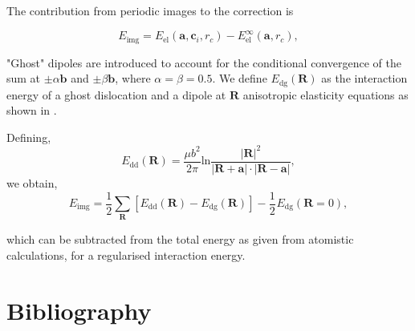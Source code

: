 \documentclass[a4paper,11pt]{article}
\begin{document}
The contribution from periodic images to the correction is 

\[ E_{\text{img} } = E_{\text{el}} (\mathbf{a}, \mathbf{c}_i , r_c) - E_{\text{el}}^{\infty}
   (\mathbf{a}, r_c),\]

"Ghost" dipoles are introduced to account for the conditional convergence of the sum at \(\pm\alpha
   \mathbf{b}\) and \(\pm \beta\mathbf{b}\), where \(\alpha = \beta = 0.5\). We define \(E_{\text{dg}} (\mathbf{R})\) as the
interaction energy of a ghost dislocation and a dipole at \(\mathbf{R}\) anisotropic elasticity
equations as shown in \cite{Cai2003}.


Defining, 
 \[ E_{\text{dd}} (\mathbf{R}) = \frac{\mu b^2}{2\pi}
   \text{ln}\frac{|\mathbf{R}|^2}{|\mathbf{R}+\mathbf{a}|\cdot|\mathbf{R}-\mathbf{a}|},
   \]
we obtain,
\[ E_{\text{img}} = \frac{1}{2}\sum_{\mathbf{R}} [ E_{\text{dd}} (\mathbf{R}) - E_{\text{dg}} (\mathbf{R}) ] - \frac{1}{2}_{}
   E_{\text{dg}} (\mathbf{R} = 0),  \]

which can be subtracted from the total energy as given from atomistic calculations, for a
regularised interaction energy. 

\section{Bibliography}
\label{sec:org9faf29c}
\label{orgad30c5f}




\end{document}
